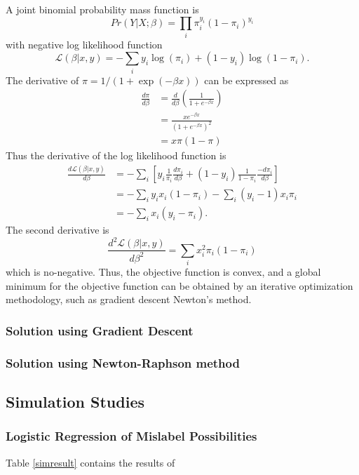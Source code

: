 \documentclass{article}
\begin{document}
A joint binomial probability mass function is 
$$Pr(Y|X;\beta) = \prod_i \pi_i^{y_i}\left(1-\pi_i\right)^{y_i}$$ with negative log likelihood function
$$\mathcal{L}\left(\beta|x, y\right) = -\sum_i y_i\log(\pi_i) + \left(1-y_i\right)\log\left(1-\pi_i\right).$$ 
The derivative of $\pi = 1/(1+\exp(-\beta x))$ can be expressed as 
\begin{align*}
\frac{d\pi}{d\beta} &= \frac{d}{d\beta}\left(\frac{1}{1+e^{-\beta x}}\right) \\
&=\frac{xe^{-\beta x}}{\left(1+e^{-\beta x}\right)^2}\\
&=x\pi(1-\pi)
\end{align*}
Thus the derivative of the log likelihood function is 
\begin{align*}
\frac{d\mathcal{L}\left(\beta|x, y\right)}{d\beta} &= -\sum_i \left[y_i\frac{1}{\pi_i}\frac{d\pi_i}{d\beta} + \left(1-y_i\right)\frac{1}{1-\pi_i}\frac{-d\pi_i}{d\beta}\right] \\
&= -\sum_i y_ix_i\left(1-\pi_i\right) - \sum_i\left(y_i-1\right)x_i\pi_i\\
&=-\sum_i x_i\left(y_i-\pi_i\right).
\end{align*} 
The second derivative is
$$\frac{d^2\mathcal{L}\left(\beta|x, y\right)}{d\beta^2} = \sum_i x_i^2\pi_i\left(1-\pi_i\right)$$ which is no-negative. Thus, the objective function is convex, and a global minimum for the objective function can be obtained by an iterative optimization methodology, such as gradient descent Newton's method. 

\subsubsection*{Solution using Gradient Descent}



\subsubsection*{Solution using Newton-Raphson method}



\subsection*{Simulation Studies}
\subsubsection*{Logistic Regression of Mislabel Possibilities}
Table \ref{simresult} contains the results of 
\end{document}

